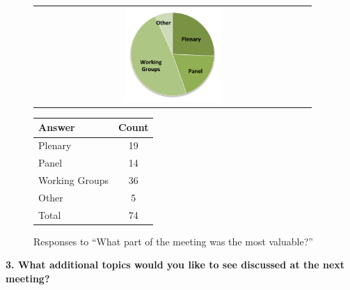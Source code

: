 \begin{figure}[h!]
    \centering
    \begin{tabular}{@{}c@{}}
        \includegraphics[width=0.35\textwidth]{figures/SurveyFig4rev}%
    \end{tabular}
    \qquad
    \begin{tabular}{@{}lc@{}}
    \toprule
    Answer & Count \\
    \midrule
    Plenary & 19 \\
    Panel & 14 \\
    Working Groups & 36 \\
    Other & 5 \\
    Total & 74 \\
    \bottomrule
    \end{tabular}
    \caption{Responses to ``What part of the meeting was the most valuable?''}
    \label{fig:SFig4}
\end{figure}

\newpage
\noindent \textbf{3. What additional topics would you like to see discussed at the next meeting?}

